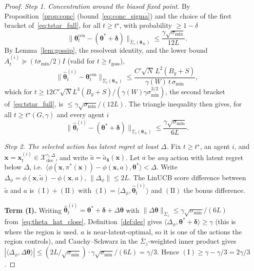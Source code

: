 \documentclass[11pt]{article}
\begin{document}
\begin{proof}
\textit{Step 1. Concentration around the biased fixed point.}
By Proposition~\ref{prop:conc} (bound~\eqref{eq:conc_sigma}) and the
choice of the first bracket of~\eqref{eq:tstar_full}, for all
$t\geq t^\star$, with probability $\geq 1-\delta$ \[
\|\bm{\theta}_t^{\mathrm{cen}}-(\bm{\theta}^{\!*}+\bm{\delta})\|_{\bar{\Sigma}_z(\bm{\theta}_\infty)}
\leq\frac{\gamma\sqrt{\sigma_{\min}}}{12L}.
\]
By Lemma~\ref{lem:gossip}, the resolvent identity, and the
lower bound $A_t^{(i)}\succeq(t\sigma_{\min}/2)I$ (valid for
$t\geq t_{\mathrm{goss}}$),
\[
\|\widehat{\bm{\theta}}_t^{(i)}-\bm{\theta}_t^{\mathrm{cen}}\|_{\bar{\Sigma}_z(\bm{\theta}_\infty)}
\leq\frac{C'\sqrt{N}\,L^2(B_y+S)}{\gamma(W)\,t\,\sigma_{\min}},
\]
which for
$t\geq 12C'\sqrt N L^3(B_y+S)/(\gamma(W)\gamma\sigma_{\min}^{3/2})$,
the second bracket of~\eqref{eq:tstar_full}, is
$\leq\gamma\sqrt{\sigma_{\min}}/(12L)$.
The triangle inequality then gives, for all $t\geq t^\star(G,\gamma)$
and every agent $i$ \begin{equation}
\|\widehat{\bm{\theta}}_t^{(i)}-(\bm{\theta}^{\!*}+\bm{\delta})\|_{\bar{\Sigma}_z(\bm{\theta}_\infty)}
\leq\frac{\gamma\sqrt{\sigma_{\min}}}{6L}.
\label{eq:theta_hat_close}
\end{equation}

\textit{Step 2. The selected action has latent regret at least $\Delta$.}
Fix $t\geq t^\star$, an agent $i$, and
$\bm{x}=\bm{x}_t^{(i)}\in\mathcal{X}_{\mathrm{dec}}^{\gamma,\Delta}$, and
write $\tilde a=\tilde a_{\bm\delta}(\bm{x})$.  Let $a$ be \emph{any}
action with latent regret below $\Delta$, i.e.\
$\langle\phi(\bm{x},\pi^{\!*}(\bm{x}))-\phi(\bm{x},a),\bm{\theta}^{\!*}\rangle<\Delta$.
Write $\Delta_\phi=\phi(\bm{x},\tilde{a})-\phi(\bm{x},a)$,
$\|\Delta_\phi\|\leq 2L$.  The LinUCB score difference between
$\tilde a$ and $a$ is $(\mathrm{I})+(\mathrm{II})$ with
$(\mathrm{I})=\langle\Delta_\phi,\widehat{\bm{\theta}}_t^{(i)}\rangle$
and $(\mathrm{II})$ the bonus difference.

\textbf{Term (I).}
Writing $\widehat{\bm{\theta}}_t^{(i)}=\bm{\theta}^{\!*}+\bm{\delta}+\Delta\bm{\theta}$
with $\|\Delta\bm{\theta}\|_{\bar{\Sigma}_z}\leq\gamma\sqrt{\sigma_{\min}}/(6L)$
from~\eqref{eq:theta_hat_close}, Definition~\ref{def:dec} gives
$\langle\Delta_\phi,\bm{\theta}^{\!*}+\bm{\delta}\rangle\geq\gamma$
(this is where the region is used. $a$ is
near-latent-optimal, so it is one of the actions the region controls),
and Cauchy--Schwarz in the $\bar{\Sigma}_z$-weighted inner product
gives
$|\langle\Delta_\phi,\Delta\bm\theta\rangle|
\leq(2L/\sqrt{\sigma_{\min}})\cdot\gamma\sqrt{\sigma_{\min}}/(6L)=\gamma/3$.
Hence $(\mathrm{I})\geq\gamma-\gamma/3=2\gamma/3$.


\end{proof}
\end{document}
